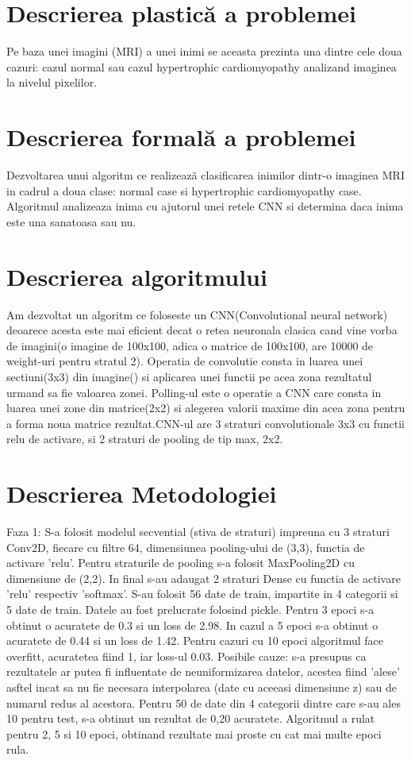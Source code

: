 \documentclass[a4papaer,12pt]{article}
\begin{document}
\section{Descrierea plastică a problemei}
Pe baza unei imagini (MRI) a unei inimi se aceasta prezinta una dintre cele doua cazuri: cazul normal sau cazul hypertrophic cardiomyopathy analizand imaginea la nivelul pixelilor.


\section{Descrierea formală a problemei}
Dezvoltarea unui algoritm ce realizează clasificarea inimilor dintr-o imaginea MRI in cadrul a doua clase: normal case si hypertrophic cardiomyopathy case. \\
\indent Algoritmul analizeaza inima cu ajutorul unei retele CNN si determina daca inima este una sanatoasa sau nu.

\section{Descrierea algoritmului}
Am dezvoltat un algoritm ce foloseste un CNN(Convolutional neural network) deoarece acesta este mai eficient decat o retea neuronala clasica cand vine vorba de imagini(o imagine de 100x100, adica o matrice de 100x100, are 10000 de weight-uri pentru stratul 2). Operatia de convolutie consta in luarea unei sectiuni(3x3) din imagine() si aplicarea unei functii pe acea zona rezultatul urmand sa fie valoarea zonei. Polling-ul este o operatie a CNN care consta in luarea unei zone din matrice(2x2) si alegerea valorii maxime din acea zona pentru a forma noua matrice rezultat.CNN-ul are 3 straturi convolutionale 3x3 cu functii relu de activare, si 2 straturi de pooling de tip max, 2x2. 

\section{Descrierea Metodologiei}
Faza 1:
S-a folosit modelul secvential (stiva de straturi) impreuna cu 3 straturi Conv2D, fiecare cu filtre 64, dimensiunea pooling-ului de (3,3), functia de activare 'relu'. Pentru straturile de pooling s-a folosit MaxPooling2D cu dimensiune de (2,2). In final s-au adaugat 2 straturi Dense cu functia de activare 'relu' respectiv 'softmax'. 
S-au folosit 56 date de train, impartite in 4 categorii si 5 date de train. Datele au fost prelucrate folosind pickle. Pentru 3 epoci s-a obtinut o acuratete de 0.3 si un loss de 2.98. In cazul a 5 epoci s-a obtinut o acuratete de 0.44 si un loss de 1.42. Pentru cazuri cu 10 epoci algoritmul face overfitt, acuratetea fiind 1, iar loss-ul 0.03.
Posibile cauze: s-a presupus ca rezultatele ar putea fi influentate de neuniformizarea datelor, acestea fiind 'alese' asftel incat sa nu fie necesara interpolarea (date cu aceeasi dimensiune z) sau de numarul redus al acestora.
Pentru 50 de date din 4 categorii dintre care s-au ales 10 pentru test, s-a obtinut un rezultat de 0,20 acuratete. Algoritmul a rulat pentru 2, 5 si 10 epoci, obtinand rezultate mai proste cu cat mai multe epoci rula. 
\end{document}
